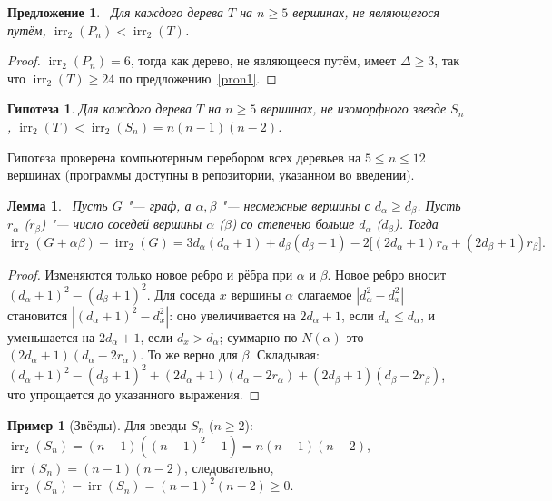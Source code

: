 \documentclass[a4paper,14pt]{extreport}
\theoremstyle{plain}
\newtheorem{lemma}{Лемма}[section]
\newtheorem{proposition}[theorem]{Предложение}
\newtheorem{conjecture}{Гипотеза}
\theoremstyle{definition}
\newtheorem{example}{Пример}
\theoremstyle{remark}
\begin{document}
\begin{proposition}~\label{pron2}
	Для каждого дерева $T$ на $n\ge5$ вершинах, не являющегося путём, $\operatorname{irr}_2(P_n)<\operatorname{irr}_2(T)$.
\end{proposition}
\begin{proof}
	$\operatorname{irr}_2(P_n)=6$, тогда как дерево, не являющееся путём, имеет $\Delta\ge3$, так что $\operatorname{irr}_2(T)\ge24$ по предложению~\ref{pron1}.
\end{proof}

\begin{conjecture}
	Для каждого дерева $T$ на $n\ge5$ вершинах, не изоморфного звезде $S_n$, $\operatorname{irr}_2(T)<\operatorname{irr}_2(S_n)=n(n-1)(n-2)$.
\end{conjecture}

Гипотеза проверена компьютерным перебором всех деревьев на $5\le n\le12$ вершинах (программы доступны в репозитории, указанном во введении).

\begin{lemma}~\label{lemn01}
	Пусть $G$ "--- граф, а $\alpha,\beta$ "--- несмежные вершины с $d_\alpha\ge d_\beta$. Пусть $r_\alpha$ ($r_\beta$) "--- число соседей вершины $\alpha$ ($\beta$) со степенью больше $d_\alpha$ ($d_\beta$). Тогда
	\begin{equation}
		\operatorname{irr}_2(G+\alpha\beta)-\operatorname{irr}_2(G)=3d_\alpha(d_\alpha+1)+d_\beta(d_\beta-1)-2\bigl[(2d_\alpha+1)r_\alpha+(2d_\beta+1)r_\beta\bigr].
	\end{equation}
\end{lemma}
\begin{proof}
	Изменяются только новое ребро и рёбра при $\alpha$ и $\beta$. Новое ребро вносит $(d_\alpha+1)^2-(d_\beta+1)^2$. Для соседа $x$ вершины $\alpha$ слагаемое $|d_\alpha^2-d_x^2|$ становится $|(d_\alpha+1)^2-d_x^2|$:
	оно увеличивается на $2d_\alpha+1$, если $d_x\le d_\alpha$, и уменьшается на $2d_\alpha+1$, если $d_x>d_\alpha$; суммарно по $N(\alpha)$ это $(2d_\alpha+1)(d_\alpha-2r_\alpha)$. То же верно для $\beta$.
	Складывая: $(d_\alpha+1)^2-(d_\beta+1)^2+(2d_\alpha+1)(d_\alpha-2r_\alpha)+(2d_\beta+1)(d_\beta-2r_\beta)$, что упрощается до указанного выражения.
\end{proof}

\begin{example}[Звёзды]
	Для звезды $S_n$ ($n\ge2$): $\operatorname{irr}_2(S_n)=(n-1)((n-1)^2-1)=n(n-1)(n-2)$, $\operatorname{irr}(S_n)=(n-1)(n-2)$, следовательно, $\operatorname{irr}_2(S_n)-\operatorname{irr}(S_n)=(n-1)^2(n-2)\ge0$.
\end{example}
\end{document}
